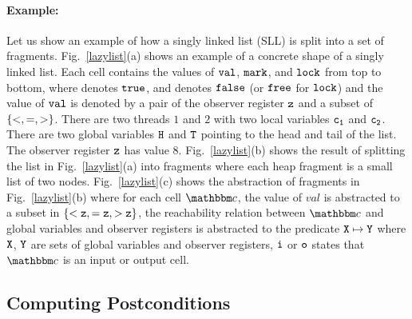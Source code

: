 \paragraph{Example:} Let us show an example of how a singly linked list (SLL) is split into a set of fragments. Fig.~\ref{lazylist}(a) shows an example of a concrete shape of a singly linked list. Each cell contains the values of $\tt val$, $\tt mark$, and $\tt lock$ from top to bottom, where \tick \; denotes $\tt true$, and \cross \; denotes $\tt false$ (or $\tt free$ for $\tt lock$) and the value of $\tt val$ is denoted by a pair of the observer register $\tt z$ and a subset of $\left\{<, =, >\right\}$. There are two threads $1$ and $2$ with two local variables $\tt c_1$ and $\tt c_2$. There are two global variables $\tt H$ and $\tt T$ pointing to the head and tail of the list. The observer register $\tt z$ has value 8. Fig.~\ref{lazylist}(b) shows the result of splitting the list in Fig.~\ref{lazylist}(a) into fragments where each heap fragment is a small list of two nodes. Fig.~\ref{lazylist}(c) shows the abstraction of fragments in Fig.~\ref{lazylist}(b) where for each cell $\cell$, the value of $val$ is abstracted to a subset in $\tt \{<z, =z, >z\}$, the reachability relation between $\cell$ and global variables and observer registers is abstracted to the predicate $\tt X \mapsto \tt Y$ where $\tt X$, $\tt Y$ are sets of global variables and observer registers, $\tt i$ or $\tt o$ states that $\cell$ is an input or output cell.

\subsection{Computing Postconditions}


  
